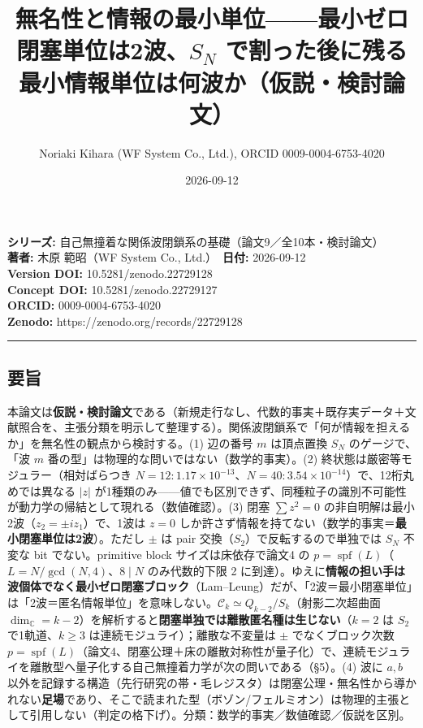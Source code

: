 \documentclass[
  a4paper,
]{ltjsarticle}
\title{無名性と情報の最小単位------最小ゼロ閉塞単位は2波、\(S_N\)
で割った後に残る最小情報単位は何波か（仮説・検討論文）}
\author{Noriaki Kihara (WF System Co., Ltd.), ORCID 0009-0004-6753-4020}
\date{2026-09-12}
\begin{document}
\maketitle

\textbf{シリーズ:}
自己無撞着な関係波閉鎖系の基礎（論文9／全10本・検討論文）\\
\textbf{著者:} 木原 範昭（WF System Co., Ltd.）　\textbf{日付:}
2026-09-12\\
\textbf{Version DOI:} 10.5281/zenodo.22729128\\
\textbf{Concept DOI:} 10.5281/zenodo.22729127\\
\textbf{ORCID:} 0009-0004-6753-4020\\
\textbf{Zenodo:} https://zenodo.org/records/22729128\\

\begin{center}\rule{0.5\linewidth}{0.5pt}\end{center}

\subsection{要旨}\label{ux8981ux65e8}

本論文は\textbf{仮説・検討論文}である（新規走行なし、代数的事実＋既存実データ＋文献照合を、主張分類を明示して整理する）。関係波閉鎖系で「何が情報を担えるか」を無名性の観点から検討する。(1)
辺の番号 \(m\) は頂点置換 \(S_N\) のゲージで、「波 \(m\)
番の型」は物理的な問いではない（数学的事実）。(2)
終状態は厳密等モジュラー（相対ばらつき
\(N=12{:}1.17\times10^{-13}\)、\(N=40{:}3.54\times10^{-14}\)）で、12桁丸めでは異なる
\(|z|\)
が1種類のみ------値でも区別できず、同種粒子の識別不可能性が動力学の帰結として現れる（数値確認）。(3)
閉塞 \(\sum z^2=0\) の非自明解は最小2波（\(z_2=\pm i z_1\)）で、1波は
\(z=0\)
しか許さず情報を持てない（数学的事実＝\textbf{最小閉塞単位は2波}）。ただし
\(\pm\) は pair 交換（\(S_2\)）で反転するので単独では \(S_N\) 不変な bit
でない。primitive block サイズは床依存で論文4 の
\(p=\operatorname{spf}(L)\)（\(L=N/\gcd(N,4)\)、\(8\mid N\)
のみ代数的下限 2
に到達）。ゆえに\textbf{情報の担い手は波個体でなく最小ゼロ閉塞ブロック}（Lam--Leung）だが、「2波＝最小閉塞単位」は「2波＝匿名情報単位」を意味しない。\(\mathcal C_k\simeq Q_{k-2}/S_k\)（射影二次超曲面
\(\dim_{\mathbb C}=k-2\)）を解析すると\textbf{閉塞単独では離散匿名種は生じない}（\(k=2\)
は \(S_2\) で1軌道、\(k\ge3\) は連続モジュライ）；離散な不変量は \(\pm\)
でなくブロック次数
\(p=\operatorname{spf}(L)\)（論文4、閉塞公理＋床の離散対称性が量子化）で、連続モジュライを離散型へ量子化する自己無撞着力学が次の問いである（§5）。(4)
波に \(a,b\)
以外を記録する構造（先行研究の帯・毛レジスタ）は閉塞公理・無名性から導かれない\textbf{足場}であり、そこで読まれた型（ボゾン/フェルミオン）は物理的主張として引用しない（判定の格下げ）。分類：数学的事実／数値確認／仮説を区別。
\end{document}
